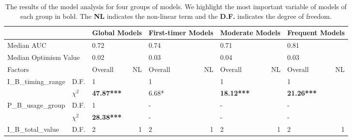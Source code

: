 \documentclass[10pt,journal,compsoc]{IEEEtran}
\begin{document}
\begin{appendices}
   
       \begin{table}[]
         \centering
         \caption{The results of the model analysis for four groups of models. We highlight the most important variable of models of each group in bold. The \textbf{NL} indicates the non-linear term and the \textbf{D.F.} indicates the degree of freedom.}
           \begin{tabular}{lp{0.5cm}p{0.8cm}rp{0.9cm}rp{0.8cm}rp{0.8cm}r}
           \toprule
           \multicolumn{2}{p{1.7cm}}{} & \multicolumn{2}{p{8em}}{\textbf{Global Models}} & \multicolumn{2}{p{1.7cm}}{\textbf{First-timer Model}s} & \multicolumn{2}{p{1.7cm}}{\textbf{Moderate Models}} & \multicolumn{2}{p{1.7cm}}{\textbf{Frequent Models}} \bigstrut[b]\\
           \midrule
           \multicolumn{2}{p{8em}}{Median AUC} & \multicolumn{2}{l}{0.72} & \multicolumn{2}{l}{0.74} & \multicolumn{2}{l}{0.71} & \multicolumn{2}{l}{0.81} \bigstrut[t]\\
           \multicolumn{2}{p{15em}}{Median Optimism Value} & \multicolumn{2}{l}{0.02} & \multicolumn{2}{l}{0.03} & \multicolumn{2}{l}{0.04} & \multicolumn{2}{l}{0.03} \bigstrut[b]\\
           \midrule
           \multicolumn{2}{l}{Factors} & Overall & \multicolumn{1}{p{3em}}{NL} & Overall & \multicolumn{1}{p{3em}}{NL} & Overall & \multicolumn{1}{p{3em}}{NL} & Overall & \multicolumn{1}{p{3em}}{NL} \bigstrut\\
           \midrule
           \multicolumn{1}{l}{\multirow{2}[2]{*}{I\_B\_timing\_range}} & D.F.  & 1     &       & 1     &       & 1     &       & 1     &  \bigstrut[t]\\
                 & $\chi^2$ & \textbf{47.87***} &       &6.68* &       & \textbf{18.12***} &       & \textbf{21.26***} &  \bigstrut[b]\\
           \midrule
           \multicolumn{1}{l}{\multirow{2}[2]{*}{P\_B\_usage\_group}} & D.F.  & 1     &       & -     &       & -     &       & -     &  \bigstrut[t]\\
                 & $\chi^2$ & \textbf{28.38***} &       & -     &       & -     &       & -     &  \bigstrut[b]\\
           \midrule
           \multicolumn{1}{l}{\multirow{2}[2]{*}{I\_B\_total\_value}} & D.F.  & 2     & \multicolumn{1}{p{4em}}{1} & 2     & \multicolumn{1}{p{3em}}{1} & 2     & \multicolumn{1}{p{3em}}{1} & 2     & \multicolumn{1}{p{5.085em}}{1} \bigstrut[t]\\

\end{tabular}
\end{table}
\end{appendices}
\end{document}
